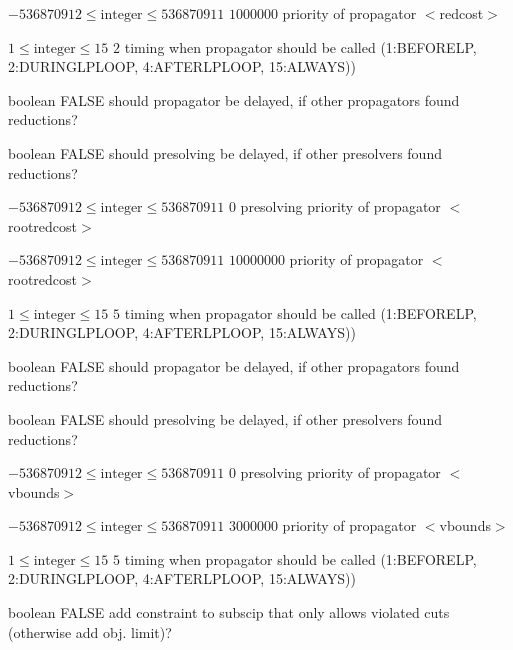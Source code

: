 %
{$-536870912\leq\textrm{integer}\leq536870911$}%
{$1000000$}%
{priority of propagator $<$redcost$>$}%
{}

%
{$1\leq\textrm{integer}\leq15$}%
{$2$}%
{timing when propagator should be called (1:BEFORELP, 2:DURINGLPLOOP, 4:AFTERLPLOOP, 15:ALWAYS))}%
{}

%
{boolean}%
{FALSE}%
{should propagator be delayed, if other propagators found reductions?}%
{}

%
{boolean}%
{FALSE}%
{should presolving be delayed, if other presolvers found reductions?}%
{}

%
{$-536870912\leq\textrm{integer}\leq536870911$}%
{$0$}%
{presolving priority of propagator $<$rootredcost$>$}%
{}

%
{$-536870912\leq\textrm{integer}\leq536870911$}%
{$10000000$}%
{priority of propagator $<$rootredcost$>$}%
{}

%
{$1\leq\textrm{integer}\leq15$}%
{$5$}%
{timing when propagator should be called (1:BEFORELP, 2:DURINGLPLOOP, 4:AFTERLPLOOP, 15:ALWAYS))}%
{}

%
{boolean}%
{FALSE}%
{should propagator be delayed, if other propagators found reductions?}%
{}

%
{boolean}%
{FALSE}%
{should presolving be delayed, if other presolvers found reductions?}%
{}

%
{$-536870912\leq\textrm{integer}\leq536870911$}%
{$0$}%
{presolving priority of propagator $<$vbounds$>$}%
{}

%
{$-536870912\leq\textrm{integer}\leq536870911$}%
{$3000000$}%
{priority of propagator $<$vbounds$>$}%
{}

%
{$1\leq\textrm{integer}\leq15$}%
{$5$}%
{timing when propagator should be called (1:BEFORELP, 2:DURINGLPLOOP, 4:AFTERLPLOOP, 15:ALWAYS))}%
{}

%
{boolean}%
{FALSE}%
{add constraint to subscip that only allows violated cuts (otherwise add obj. limit)?}%
{}

